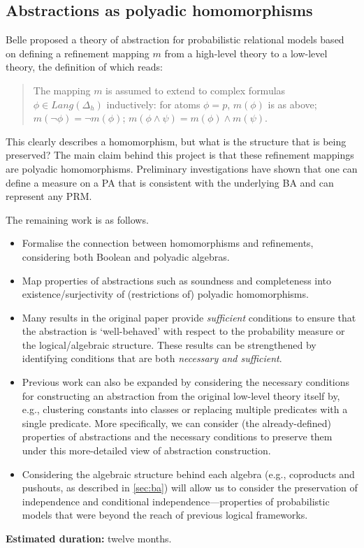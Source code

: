 \documentclass{article}
\begin{document}
\subsection{Abstractions as polyadic homomorphisms} \label{sec:abstractions}

Belle \cite{DBLP:journals/corr/abs-1810-02434} proposed a theory of
abstraction for probabilistic relational models based on defining a refinement
mapping $m$ from a high-level theory to a low-level theory, the definition of
which reads:
\begin{quote}
  The mapping $m$ is assumed to extend to complex formulas $\phi \in
  \mathit{Lang}(\Delta_h)$ inductively: for atoms $\phi = p$, $m(\phi)$ is as
  above; $m(\neg\phi) = \neg m(\phi)$; $m(\phi \land \psi) = m(\phi) \land
  m(\psi)$.
\end{quote}
This clearly describes a homomorphism, but what is the structure that is being
preserved? The main claim behind this project is that these refinement mappings
are polyadic homomorphisms. Preliminary investigations have shown that one can
define a measure on a PA that is consistent with the underlying BA and can
represent any PRM.

The remaining work is as follows.
\begin{itemize}
\item Formalise the connection between homomorphisms and refinements,
  considering both Boolean and polyadic algebras.
\item Map properties of abstractions such as soundness and completeness into
  existence/surjectivity of (restrictions of) polyadic homomorphisms.
\item Many results in the original paper provide \emph{sufficient} conditions to
  ensure that the abstraction is `well-behaved' with respect to the probability
  measure or the logical/algebraic structure. These results can be strengthened
  by identifying conditions that are both \emph{necessary and sufficient}.
\item Previous work can also be expanded by considering the necessary conditions
  for constructing an abstraction from the original low-level theory itself by,
  e.g., clustering constants into classes or replacing multiple predicates with
  a single predicate. More specifically, we can consider (the already-defined)
  properties of abstractions and the necessary conditions to preserve them under
  this more-detailed view of abstraction construction.
\item Considering the algebraic structure behind each algebra (e.g., coproducts
  and pushouts, as described in \cref{sec:ba}) will allow us to consider the
  preservation of independence and conditional independence---properties of
  probabilistic models that were beyond the reach of previous logical
  frameworks.
\end{itemize}
{\bf Estimated duration:} twelve months.
\end{document}
